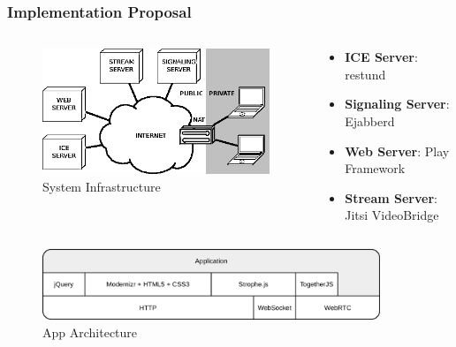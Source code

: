 \documentclass[compress]{beamer}
\begin{document}
		\begin{frame}[c]
		\frametitle{Implementation Proposal}


\begin{columns}[c]
\begin{column}{.4\textwidth}
		\begin{figure}[H]
			\includegraphics[width=\textwidth]{figures/arch.png}
			\caption{System Infrastructure}
		\end{figure}
\end{column}
\begin{column}{.6\textwidth}

\begin{itemize}
\small
		\item \textbf{ICE Server}: restund
		\vfill
		\item \textbf{Signaling Server}: Ejabberd
		\vfill
		\item \textbf{Web Server}: Play Framework
		\vfill
		\item \textbf{Stream Server}: Jitsi VideoBridge
		\end{itemize}

\end{column}
\end{columns}



{
		\centering
		\begin{figure}[H]
			\includegraphics[width=0.9\textwidth]{figures/apparch.png}
			\caption{App Architecture}
		\end{figure}
}

		\end{frame}
\end{document}
